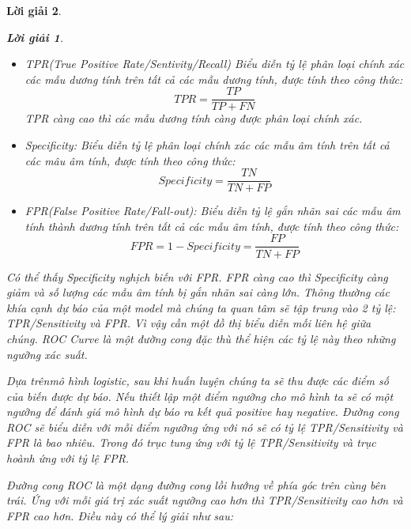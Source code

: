 \documentclass[14pt, a4paper]{article}
\theoremstyle{sltheorem}
\theoremstyle{soltheorem}
\newtheorem*{loigiai}{Lời giải}
\begin{document}
\begin{loigiai}
\begin{loigiai}
\begin{itemize}
            \begin{itemize}
                \item TPR(True Positive Rate/Sentivity/Recall) Biểu diễn tỷ lệ phân loại chính xác các mẫu dương tính trên tất cả các mẫu dương tính, được tính theo công thức:
                \begin{equation*}
                    TPR = \dfrac{TP}{TP + FN}
                \end{equation*}
                TPR càng cao thì các mẫu dương tính càng được phân loại chính xác.
                \item Specificity: Biểu diễn tỷ lệ phân loại chính xác các mẫu âm tính trên tất cả các mâu âm tính, được tính theo công thức:
                \begin{equation*}
                    Specificity = \dfrac{TN}{TN + FP}
                \end{equation*}
                \item FPR(False Positive Rate/Fall-out): Biểu diễn tỷ lệ gắn nhãn sai các mẫu âm tính thành dương tính trên tất cả các mẫu âm tính, được tính theo công thức:
                \begin{equation*}
                    FPR = 1 - Specificity = \dfrac{FP}{TN + FP}
                \end{equation*}
            \end{itemize}
            Có thể thấy Specificity nghịch biến với FPR. FPR càng cao thì Specificity càng giảm và số lượng các mẫu âm tính bị gắn nhãn sai càng lớn.
            Thông thường các khía cạnh dự báo của một model mà chúng ta quan tâm sẽ tập trung vào 2 tỷ lệ: TPR/Sensitivity và FPR. 
            Vì vậy cần một đồ thị biểu diễn mối liên hệ giữa chúng. 
            ROC Curve là một đường cong đặc thù thể hiện các tỷ lệ này theo những ngưỡng xác suất.

            Dựa trênmô hình logistic, sau khi huấn luyện chúng ta sẽ thu được các điểm số của biến được dự báo. 
            Nếu thiết lập một điểm ngưỡng cho mô hình ta sẽ có một ngưỡng để đánh giá mô hình dự báo ra kết quả positive hay negative. 
            Đường cong ROC sẽ biểu diễn với mỗi điểm ngưỡng ứng với nó sẽ có tỷ lệ TPR/Sensitivity và FPR là bao nhiêu. 
            Trong đó trục tung ứng với tỷ lệ TPR/Sensitivity và trục hoành ứng với tỷ lệ FPR.

            Đường cong ROC là một dạng đường cong lồi hướng về phía góc trên cùng bên trái. 
            Ứng với mỗi giá trị xác suất ngưỡng cao hơn thì TPR/Sensitivity cao hơn và FPR cao hơn. Điều này có thể lý giải như sau:


\end{itemize}
\end{loigiai}
\end{loigiai}
\end{document}

